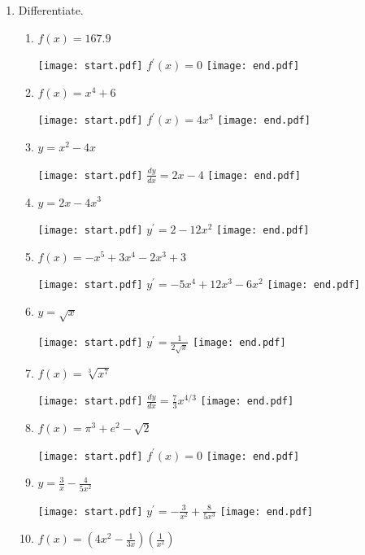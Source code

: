 \documentclass[12pt]{article}
\begin{document}
\begin{enumerate}

\item Differentiate.

\begin{enumerate}

\item $f(x)=167.9$

\texttt{[image: start.pdf]}
{{$f^{\prime}(x)=0$}}
\texttt{[image: end.pdf]}


\item $f(x)=x^4+6$

\texttt{[image: start.pdf]}
{{$f^{\prime}(x)=4x^3$}}
\texttt{[image: end.pdf]}


\item $y=x^2-4x$

\texttt{[image: start.pdf]}
{{$\displaystyle \frac{dy}{dx}=2x-4$}}
\texttt{[image: end.pdf]}


\item $y=2x-4x^3$

\texttt{[image: start.pdf]}
{{$y^{\prime}=2-12x^2$}}
\texttt{[image: end.pdf]}


\item $f(x)=-x^5+3x^4-2x^3+3$

\texttt{[image: start.pdf]}
{{$y^{\prime}=-5x^4+12x^3-6x^2$}}
\texttt{[image: end.pdf]}


\item $y=\sqrt{x}$

\texttt{[image: start.pdf]}
{{$\displaystyle y^{\prime}=\frac{1}{2\sqrt{x}}$}}
\texttt{[image: end.pdf]}


\item $\displaystyle f(x)=\sqrt[3]{x^7}$

\texttt{[image: start.pdf]}
{{$\displaystyle \frac{dy}{dx}=\frac{7}{3}x^{4/3}$}}
\texttt{[image: end.pdf]}


\item $f(x)= \pi^3+e^2-\sqrt{2}$

\texttt{[image: start.pdf]}
{{$\displaystyle f^{\prime}(x)=0$}}
\texttt{[image: end.pdf]}


\item $\displaystyle y=\frac{3}{x}-\frac{4}{5x^2}$

\texttt{[image: start.pdf]}
{{$\displaystyle y^{\prime}=-\frac{3}{x^2}+\frac{8}{5x^3}$}}
\texttt{[image: end.pdf]}


\item $\displaystyle f(x)=\left(4x^2-\frac{1}{3x}\right)\left(\frac{1}{x^2}\right)$


\end{enumerate}
\end{enumerate}
\end{document}
